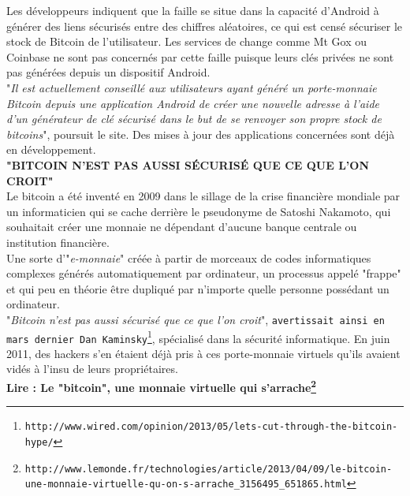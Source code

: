 \documentclass[11pt,twoside,a4paper]{article}
\begin{document}
Les d{\'e}veloppeurs indiquent que la faille se situe dans la capacit{\'e} d'Android {\`a} g{\'e}n{\'e}rer des liens s{\'e}curis{\'e}s entre des chiffres al{\'e}atoires, ce qui est cens{\'e} s{\'e}curiser le stock de Bitcoin de l'utilisateur. Les services de change comme Mt Gox ou Coinbase ne sont pas concern{\'e}s par cette faille puisque leurs cl{\'e}s priv{\'e}es ne sont pas g{\'e}n{\'e}r{\'e}es depuis un dispositif Android. ~\\

"\emph{Il est actuellement conseill{\'e} aux utilisateurs ayant g{\'e}n{\'e}r{\'e} un porte-monnaie Bitcoin depuis une application Android de cr{\'e}er une nouvelle adresse {\`a} l'aide d'un g{\'e}n{\'e}rateur de cl{\'e} s{\'e}curis{\'e} dans le but de se renvoyer son propre stock de bitcoins}", poursuit le site. Des mises {\`a} jour des applications concern{\'e}es sont d{\'e}j{\`a} en d{\'e}veloppement. ~\\

\textbf{"BITCOIN N'EST PAS AUSSI S{\'E}CURIS{\'E} QUE CE QUE L'ON CROIT"} ~\\

Le bitcoin a {\'e}t{\'e} invent{\'e} en 2009 dans le sillage de la crise financi{\`e}re mondiale par un informaticien qui se cache derri{\`e}re le pseudonyme de Satoshi Nakamoto, qui souhaitait cr{\'e}er une monnaie ne d{\'e}pendant d'aucune banque centrale ou institution financi{\`e}re. ~\\

Une sorte d'"\emph{e-monnaie}" cr{\'e}{\'e}e {\`a} partir de morceaux de codes informatiques complexes g{\'e}n{\'e}r{\'e}s automatiquement par ordinateur, un processus appel{\'e} "frappe" et qui peu en th{\'e}orie {\^e}tre dupliqu{\'e} par n'importe quelle personne poss{\'e}dant un ordinateur. ~\\

"\emph{Bitcoin n'est pas aussi s{\'e}curis{\'e} que ce que l'on croit}", \texttt{avertissait ainsi en mars dernier Dan Kaminsky\footnote{\texttt{http://www.wired.com/opinion/2013/05/lets-cut-through-the-bitcoin-hype/}}}, sp{\'e}cialis{\'e} dans la s{\'e}curit{\'e} informatique. En juin 2011, des hackers s'en {\'e}taient d{\'e}j{\`a} pris {\`a} ces porte-monnaie virtuels qu'ils avaient vid{\'e}s {\`a} l'insu de leurs propri{\'e}taires. ~\\ 

\textbf{Lire : Le "bitcoin", une monnaie virtuelle qui s'arrache\footnote{\texttt{http://www.lemonde.fr/technologies/article/2013/04/09/le-bitcoin-une-monnaie-virtuelle-qu-on-s-arrache\_3156495\_651865.html}}} ~\\
\end{document}
